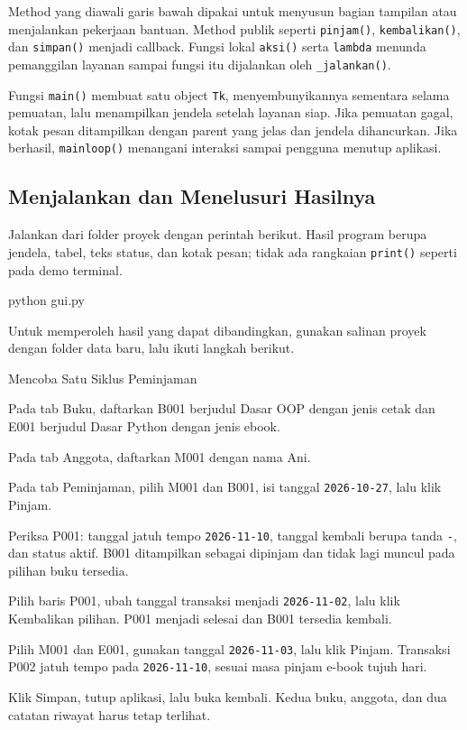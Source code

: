 \begin{kode}[gui.py]
\end{kode}

Method yang diawali garis bawah dipakai untuk menyusun bagian tampilan atau menjalankan pekerjaan bantuan. Method publik seperti \texttt{pinjam()}, \texttt{kembalikan()}, dan \texttt{simpan()} menjadi callback. Fungsi lokal \texttt{aksi()} serta \texttt{lambda} menunda pemanggilan layanan sampai fungsi itu dijalankan oleh \texttt{\_jalankan()}.

Fungsi \texttt{main()} membuat satu object \texttt{Tk}, menyembunyikannya sementara selama pemuatan, lalu menampilkan jendela setelah layanan siap. Jika pemuatan gagal, kotak pesan ditampilkan dengan parent yang jelas dan jendela dihancurkan. Jika berhasil, \texttt{mainloop()} menangani interaksi sampai pengguna menutup aplikasi.

\subsection{Menjalankan dan Menelusuri Hasilnya}

Jalankan dari folder proyek dengan perintah berikut. Hasil program berupa jendela, tabel, teks status, dan kotak pesan; tidak ada rangkaian \texttt{print()} seperti pada demo terminal.

\begin{keluaran}
python gui.py
\end{keluaran}

Untuk memperoleh hasil yang dapat dibandingkan, gunakan salinan proyek dengan folder data baru, lalu ikuti langkah berikut.

\begin{langkah}{Mencoba Satu Siklus Peminjaman}
  \item Pada tab Buku, daftarkan B001 berjudul Dasar OOP dengan jenis cetak dan E001 berjudul Dasar Python dengan jenis ebook.
  \item Pada tab Anggota, daftarkan M001 dengan nama Ani.
  \item Pada tab Peminjaman, pilih M001 dan B001, isi tanggal \texttt{2026-10-27}, lalu klik Pinjam.
  \item Periksa P001: tanggal jatuh tempo \texttt{2026-11-10}, tanggal kembali berupa tanda \texttt{-}, dan status aktif. B001 ditampilkan sebagai dipinjam dan tidak lagi muncul pada pilihan buku tersedia.
  \item Pilih baris P001, ubah tanggal transaksi menjadi \texttt{2026-11-02}, lalu klik Kembalikan pilihan. P001 menjadi selesai dan B001 tersedia kembali.
  \item Pilih M001 dan E001, gunakan tanggal \texttt{2026-11-03}, lalu klik Pinjam. Transaksi P002 jatuh tempo pada \texttt{2026-11-10}, sesuai masa pinjam e-book tujuh hari.
  \item Klik Simpan, tutup aplikasi, lalu buka kembali. Kedua buku, anggota, dan dua catatan riwayat harus tetap terlihat.
\end{langkah}

